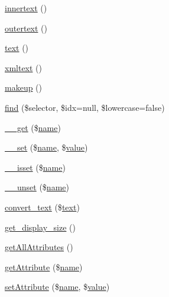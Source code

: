 \begin{DoxyCompactItemize}
\item 
\hyperlink{classsimple__html__dom__node_a3791d55e93a3af992d58a3db23abab9b}{innertext} ()
\item 
\hyperlink{classsimple__html__dom__node_a64d25961093a3b4c7b9b26a6d56c5831}{outertext} ()
\item 
\hyperlink{classsimple__html__dom__node_a37df362c2f77a0045fa8af094f432238}{text} ()
\item 
\hyperlink{classsimple__html__dom__node_aaca21e3e742f813c78857a91f389fa66}{xmltext} ()
\item 
\hyperlink{classsimple__html__dom__node_a6023a015b0fefd6a3b2ad737bf7fd133}{makeup} ()
\item 
\hyperlink{classsimple__html__dom__node_afbf375e355aa32c25f7e389a04ddced0}{find} (\$selector, \$idx=null, \$lowercase=false)
\item 
\hyperlink{classsimple__html__dom__node_abc8e9e31bb15c8a44c3210ec551407c8}{\+\_\+\+\_\+get} (\$\hyperlink{dom__testcase_8php_a7e76f3957f225b9a14d6fab0a55392ce}{name})
\item 
\hyperlink{classsimple__html__dom__node_a83c2703c91959192f759992ad5640b67}{\+\_\+\+\_\+set} (\$\hyperlink{dom__testcase_8php_a7e76f3957f225b9a14d6fab0a55392ce}{name}, \$\hyperlink{dom__testcase_8php_aa1e367627f46ba8a185ec02e58272f80}{value})
\item 
\hyperlink{classsimple__html__dom__node_a8f132f051b7cd7d570ccb9f6e2bb4201}{\+\_\+\+\_\+isset} (\$\hyperlink{dom__testcase_8php_a7e76f3957f225b9a14d6fab0a55392ce}{name})
\item 
\hyperlink{classsimple__html__dom__node_a8a93654c7bfe3f0a9bb7af531e513d44}{\+\_\+\+\_\+unset} (\$\hyperlink{dom__testcase_8php_a7e76f3957f225b9a14d6fab0a55392ce}{name})
\item 
\hyperlink{classsimple__html__dom__node_a23887642cd0616d2eed24d7c39c821fc}{convert\+\_\+text} (\$\hyperlink{classsimple__html__dom__node_a37df362c2f77a0045fa8af094f432238}{text})
\item 
\hyperlink{classsimple__html__dom__node_a29f9eadb33488a28542a01215970faca}{get\+\_\+display\+\_\+size} ()
\item 
\hyperlink{classsimple__html__dom__node_a87ba362b0d72b64e0da6f095c5c40ba5}{get\+All\+Attributes} ()
\item 
\hyperlink{classsimple__html__dom__node_ae954da422d40fc286691e54679e44c6f}{get\+Attribute} (\$\hyperlink{dom__testcase_8php_a7e76f3957f225b9a14d6fab0a55392ce}{name})
\item 
\hyperlink{classsimple__html__dom__node_a545f43e4d937e0e272a4bafe8b411d55}{set\+Attribute} (\$\hyperlink{dom__testcase_8php_a7e76f3957f225b9a14d6fab0a55392ce}{name}, \$\hyperlink{dom__testcase_8php_aa1e367627f46ba8a185ec02e58272f80}{value})

\end{DoxyCompactItemize}
